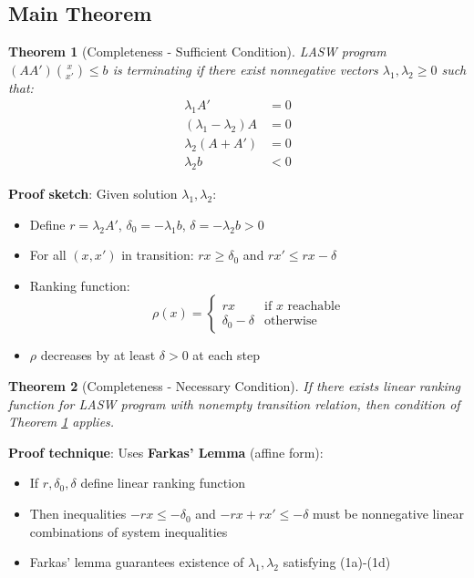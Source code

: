 \documentclass{article}
\newtheorem{theorem}{Theorem}
\begin{document}
\subsection{Main Theorem}

\begin{theorem}[Completeness - Sufficient Condition]
\label{thm:sufficient}
LASW program $(AA') \binom{x}{x'} \leq b$ is terminating if there exist nonnegative vectors $\lambda_1, \lambda_2 \geq 0$ such that:
\begin{align}
\lambda_1 A' &= 0 \tag{1a}\\
(\lambda_1 - \lambda_2) A &= 0 \tag{1b}\\
\lambda_2 (A + A') &= 0 \tag{1c}\\
\lambda_2 b &< 0 \tag{1d}
\end{align}
\end{theorem}

\textbf{Proof sketch}: Given solution $\lambda_1, \lambda_2$:
\begin{itemize}
    \item Define $r = \lambda_2 A'$, $\delta_0 = -\lambda_1 b$, $\delta = -\lambda_2 b > 0$
    \item For all $(x, x')$ in transition: $rx \geq \delta_0$ and $rx' \leq rx - \delta$
    \item Ranking function:
    \begin{equation}
    \rho(x) = \begin{cases}
    rx & \text{if } x \text{ reachable}\\
    \delta_0 - \delta & \text{otherwise}
    \end{cases}
    \end{equation}
    \item $\rho$ decreases by at least $\delta > 0$ at each step
\end{itemize}

\begin{theorem}[Completeness - Necessary Condition]
\label{thm:necessary}
If there exists linear ranking function for LASW program with nonempty transition relation, then condition of Theorem \ref{thm:sufficient} applies.
\end{theorem}

\textbf{Proof technique}: Uses \textbf{Farkas' Lemma} (affine form):
\begin{itemize}
    \item If $r, \delta_0, \delta$ define linear ranking function
    \item Then inequalities $-rx \leq -\delta_0$ and $-rx + rx' \leq -\delta$ must be nonnegative linear combinations of system inequalities
    \item Farkas' lemma guarantees existence of $\lambda_1, \lambda_2$ satisfying (1a)-(1d)
\end{itemize}
\end{document}
